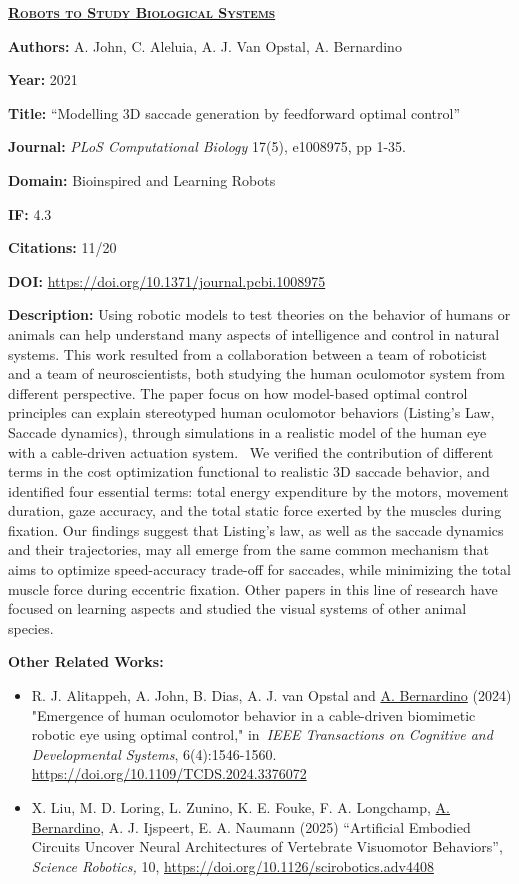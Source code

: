 \documentclass[
]{article}
\begin{document}
\textbf{\textsc{\ul{Robots to Study Biological Systems}}}

\textbf{Authors:} A. John, C. Aleluia, A. J. Van Opstal, A. Bernardino

\textbf{Year:} 2021

\textbf{Title:} ``Modelling 3D saccade generation by feedforward optimal
control''

\textbf{Journal:} \emph{PLoS Computational Biology} 17(5), e1008975, pp
1-35.

\textbf{Domain:} Bioinspired and Learning Robots

\textbf{IF:} 4.3

\textbf{Citations:} 11/20

\textbf{DOI:} \url{https://doi.org/10.1371/journal.pcbi.1008975}

\textbf{Description:} Using robotic models to test theories on the
behavior of humans or animals can help understand many aspects of
intelligence and control in natural systems. This work resulted from a
collaboration between a team of roboticist and a team of
neuroscientists, both studying the human oculomotor system from
different perspective. The paper focus on how model-based optimal
control principles can explain stereotyped human oculomotor behaviors
(Listing's Law, Saccade dynamics), through simulations in a realistic
model of the human eye with a cable-driven actuation system. ~We
verified the contribution of different terms in the cost optimization
functional to realistic 3D saccade behavior, and identified four
essential terms: total energy expenditure by the motors, movement
duration, gaze accuracy, and the total static force exerted by the
muscles during fixation. Our findings suggest that Listing's law, as
well as the saccade dynamics and their trajectories, may all emerge from
the same common mechanism that aims to optimize speed-accuracy trade-off
for saccades, while minimizing the total muscle force during eccentric
fixation. Other papers in this line of research have focused on learning
aspects and studied the visual systems of other animal species.

\textbf{Other Related Works:}

\begin{itemize}
\item
  R. J. Alitappeh, A. John, B. Dias, A. J. van Opstal and \ul{A.
  Bernardino} (2024) "Emergence of human oculomotor behavior in a
  cable-driven biomimetic robotic eye using optimal control,"
  in~\emph{IEEE Transactions on Cognitive and Developmental Systems},
  6(4):1546-1560. \url{https://doi.org/10.1109/TCDS.2024.3376072}
\item
  X. Liu, M. D. Loring, L. Zunino, K. E. Fouke, F. A. Longchamp, \ul{A.
  Bernardino}, A. J. Ijspeert, E. A. Naumann (2025) ``Artificial
  Embodied Circuits Uncover Neural Architectures of Vertebrate
  Visuomotor Behaviors'', \emph{Science Robotics,} 10,
  \url{https://doi.org/10.1126/scirobotics.adv4408}
\end{itemize}
\end{document}
